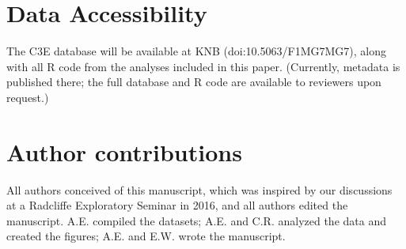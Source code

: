 \documentclass{article}
\begin{document}
\section*{Data Accessibility}
The C3E database will be available at KNB (doi:10.5063/F1MG7MG7), along with all R code from the analyses included in this paper. (Currently, metadata is published there; the full database and R code are available to reviewers upon request.)

\section*{Author contributions} All authors conceived of this manuscript, which was inspired by our discussions at a Radcliffe Exploratory Seminar in 2016, and all authors edited the manuscript. A.E. compiled the datasets; A.E. and C.R. analyzed the data and created the figures; A.E. and E.W. wrote the manuscript.
\end{document}
